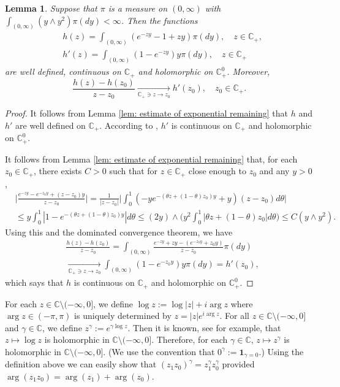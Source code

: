 \documentclass[12pt,a4paper]{amsart}
\theoremstyle{plain}
\newtheorem{lem}[thm]{Lemma}
\theoremstyle{definition}
\numberwithin{equation}{section}
\begin{document}
\begin{lem}
  \label{lem: extension lemma for branching mechanism}
  Suppose that  $\pi$ is a measure on $(0,\infty)$ with $\int_{(0,\infty)} (y \wedge y^2) \pi(dy)< \infty$.
  Then the functions
  \begin{align}
    & h (z)
      = \int_{(0,\infty)} (e^{-zy} - 1 + zy) \pi(dy), \quad z \in \mathbb C_+, \\
    & h'(z)
      = \int_{(0,\infty)}(1- e^{-zy})y \pi(dy), \quad z \in \mathbb C_+
  \end{align}
  are well defined, continuous on $\mathbb C_+$ and holomorphic on $\mathbb C_+^0$.
  Moreover,
  \[
    \frac{h(z)-h(z_0)}{z-z_0}
    \xrightarrow[\mathbb C_+\ni z \to z_0]{} h'(z_0),\quad z_0 \in \mathbb C_+.
  \]
\end{lem}
\begin{proof}
  It follows from Lemma \ref{lem: estimate of exponential remaining} that $h$ and $h'$ are well defined on $\mathbb C_+$.
  According to \cite[Theorems 3.2. \& Proposition 3.6]{SchillingSongVondravcek2010Bernstein}, $h'$ is continuous on $\mathbb C_+$ and holomorphic on $\mathbb C_+^0$.

  It follows from Lemma \ref{lem: estimate of exponential remaining} that, for each $z_0 \in \mathbb C_+$,  there exists $C>0$ such that for $z \in \mathbb C_+$ close enough to $z_0$ and any $y>0$,
  \begin{align}
    & \Big| \frac{e^{-zy} - e^{-z_0 y}+(z-z_0) y}{z-z_0} \Big|
      = \frac{1}{|z-z_0|}\Big| \int_0^1 (-y e^{-(\theta z+(1-\theta)z_0)y}+y)(z-z_0)d\theta\Big| \\
    & \leq y\int_0^1 |1-e^{-(\theta z +(1-\theta)z_0)y}| d\theta
      \leq (2y) \wedge\Big( y^2\int_0^1|\theta z+(1-\theta)z_0|d\theta\Big)
      \leq C(y\wedge y^2).
  \end{align}
  Using this and the dominated convergence theorem, we have
  \begin{align}
    & \frac{h(z)-h(z_0)}{z-z_0} = \int_{(0,\infty)} \frac{e^{-zy}+zy -(e^{-z_0 y}+z_0 y)}{z-z_0}  \pi(dy) \\
    & \xrightarrow[\mathbb C_+\ni z\to z_0]{} \int_{(0,\infty)}(1 - e^{-z_0 y} )y\pi(dy) = h'(z_0),
  \end{align}
  which says that $h$ is continuous on $\mathbb C_+$ and holomorphic on $\mathbb C_+^0$.
\end{proof}

For each $z\in \mathbb C\setminus (-\infty,0]$, we define $ \log z := \log |z| + i \arg z$ where $\arg z \in (-\pi,\pi)$ is uniquely determined by $ z = |z|e^{i \arg z}$. 	
For all $z\in \mathbb C\setminus (-\infty,0]$ and $\gamma \in \mathbb C$, we define $ z^\gamma := e^{\gamma \log z}. $
Then it is known, see \cite[Theorem 6.1]{SteinShakarchi2003Complex} for example, that $z\mapsto \log z$ is holomorphic in $\mathbb C\setminus (-\infty,0]$.
Therefore, for each $\gamma \in \mathbb C$, $z\mapsto z^\gamma$ is holomorphic in $\mathbb C\setminus (-\infty,0]$. (We use the convention that  $0^\gamma := \mathbf 1_{\gamma = 0}$.)
Using the definition above we can easily show that $(z_1z_0)^\gamma = z_1^\gamma z_0^\gamma$ provided $\arg (z_1z_0)=\arg (z_1) + \arg(z_0)$.
\end{document}
